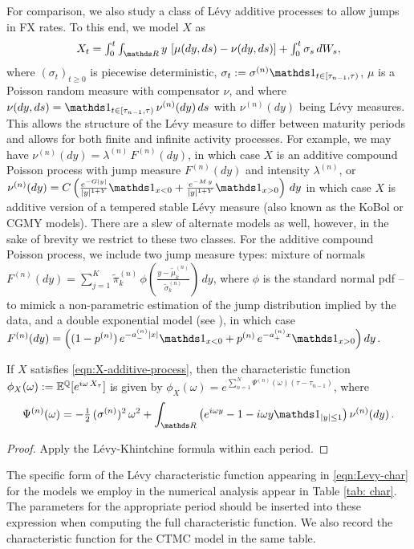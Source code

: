 \documentclass[onefignum,onetabnum]{siamonline190516}
\begin{document}
For comparison, we also study a class of L\'evy additive processes to allow jumps in FX rates. To this end, we model $X$ as
\begin{equation}
    X_t = \textstyle\int_0^t \textstyle\int_\R y\, \left[\mu(dy,ds)-\nu(dy,ds)\right]+\textstyle\int_0^t \sigma_s\,dW_s,
    \label{eqn:X-additive-process}
\end{equation}
where $(\sigma_t)_{t\ge0}$ is piecewise deterministic, $\sigma_t :=\sigma^{(n)} \Id_{t\in[\tau_{n-1},\tau)}$, $\mu$ is a Poisson random measure with compensator $\nu$, and where $\nu(dy,ds)=\Id_{t\in[\tau_{n-1},\tau)}\,\nu^{(n)}(dy)\,ds$ with $\nu^{(n)}(dy)$ being L\'evy measures. This allows the structure of the L\'evy measure to differ between maturity periods and allows for both finite and infinite activity processes. For example, we may have  $\nu^{(n)}(dy)=\lambda^{(n)}\,F^{(n)}(dy)$, in which case $X$ is an additive compound Poisson process with jump measure $F^{(n)}(dy)$ and intensity $\lambda^{(n)}$, or   $\nu^{(n)}(dy)=C\left(\frac{e^{-G|y|}}{|y|^{1+Y}}\Id_{x<0} + \frac{e^{-M\,y}}{|y|^{1+Y}}\Id_{x>0}\right)\,dy$ in which case $X$ is additive version of a tempered stable L\'evy measure (also known as the KoBol \cite{boyarchenko2000option,boyarchenko2002non} or CGMY \cite{carr2002fine} models). There are a slew of alternate models as well, however, in the sake of brevity we restrict to these two classes. For the additive compound Poisson process, we include two jump measure types: mixture of normals $F^{(n)}(dy) = \sum_{j=1}^K\tilde{\pi}_k^{(n)}\,\phi\left(\frac{y-\tilde{\mu}_k^{(n)}}{\tilde{\sigma}_k^{(n)}}\right)\,dy$, where $\phi$ is the standard normal pdf -- to mimick a non-parametric estimation of the jump distribution implied by the data, and a double exponential model (see \cite{kou2004option}), in which case $F^{(n)}(dy)=\left((1-p^{(n)})\,e^{-a_-^{(n)}|x|}\Id_{x<0} +p^{(n)}\,e^{-a_+^{(n)}x}\Id_{x>0} \right)dy$.
\begin{proposition}
\label{prop:LevyAdditive}
    If $X$ satisfies \eqref{eqn:X-additive-process}, then the characteristic function
$\phi_{X}(\omega):={{\mathbb{E}}^{\mathbb{Q}}}[e^{i\omega\,X_{\tau}}]$ is given by $\phi_{X}(\omega)=e^{\sum_{n=1}^N \Psi^{(n)}(\omega)(\tau-\tau_{n-1})}$,
         where
        \begin{equation}
        \Psi^{(n)}(\omega)=-\tfrac12\, (\sigma^{(n)})^2\,\omega^2 + \int_\R \left(e^{i\omega y}-1-i\omega y \Id_{|y|\le 1}\right)\nu^{(n)}(dy)\,.
        \label{eqn:Levy-char}
        \end{equation}
\end{proposition}
\begin{proof}
    Apply the L\'evy-Khintchine formula \cite[Chap 1.2.4]{applebaum2009levy} within each period.
\end{proof}
The specific form of the L\'evy characteristic function appearing in \eqref{eqn:Levy-char} for the models we employ in the numerical analysis appear in Table \ref{tab: char}. The parameters for the appropriate period should be inserted into these expression when computing the full characteristic function. We also record the characteristic function for the CTMC model in the same table.
\end{document}

